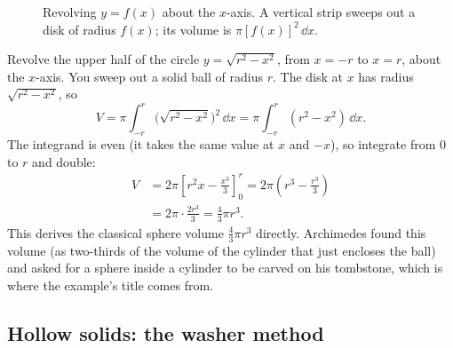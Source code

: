 \begin{figure}[H]
\centering
{}
\caption{Revolving $y=f(x)$ about the $x$-axis. A vertical strip sweeps out a disk
of radius $f(x)$; its volume is $\pi[f(x)]^2\,\dd x$.}
\label{ch26:fig-disk}
\end{figure}

\begin{example}
\label{ch26:ex-sphere}
Revolve the upper half of the circle $y = \sqrt{r^2 - x^2}$, from $x=-r$ to
$x=r$, about the $x$-axis. You sweep out a solid ball of radius $r$. The disk at
$x$ has radius $\sqrt{r^2-x^2}$, so
\[
  V = \pi\int_{-r}^{r}\bigl(\sqrt{r^2-x^2}\bigr)^2\,\dd x
    = \pi\int_{-r}^{r}(r^2 - x^2)\,\dd x.
\]
The integrand is even (it takes the same value at $x$ and $-x$), so integrate
from $0$ to $r$ and double:
\begin{align*}
  V &= 2\pi\left[r^2 x - \frac{x^3}{3}\right]_0^{r}
     = 2\pi\left(r^3 - \frac{r^3}{3}\right)\\
    &= 2\pi\cdot\frac{2r^3}{3} = \frac{4}{3}\pi r^3.
\end{align*}
This derives the classical sphere volume $\tfrac43\pi r^3$ directly. Archimedes
found this volume (as two-thirds of the volume of the cylinder that just encloses
the ball) and asked for a sphere inside a cylinder to be carved on his tombstone,
which is where the example's title comes from.
\end{example}

\subsection{Hollow solids: the washer method}

